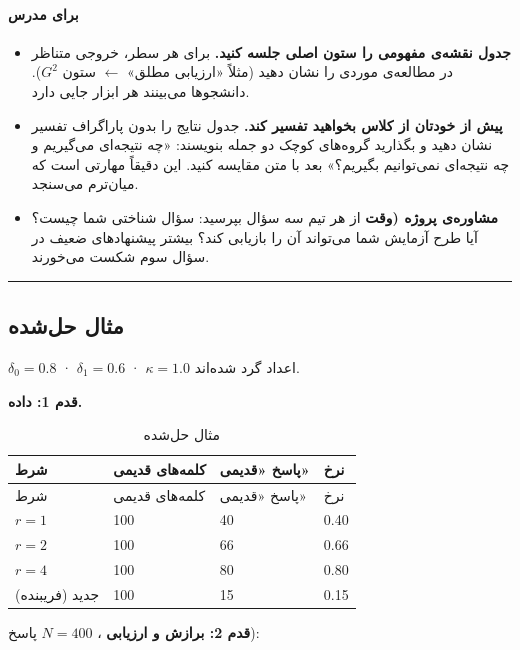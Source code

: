 \paragraph{برای مدرس}

\begin{itemize}
\tightlist
\item
  \textbf{جدول نقشه‌ی مفهومی را ستون اصلی جلسه کنید.} برای هر سطر، خروجی
  متناظر در مطالعه‌ی موردی را نشان دهید (مثلاً «ارزیابی مطلق» \ensuremath{\leftarrow} ستون
  \(G^2\)). دانشجوها می‌بینند هر ابزار جایی دارد.
\item
  \textbf{پیش از خودتان از کلاس بخواهید تفسیر کند.} جدول نتایج را بدون
  پاراگراف تفسیر نشان دهید و بگذارید گروه‌های کوچک دو جمله بنویسند: «چه
  نتیجه‌ای می‌گیریم و چه نتیجه‌ای نمی‌توانیم بگیریم؟» بعد با متن مقایسه
  کنید. این دقیقاً مهارتی است که میان‌ترم می‌سنجد.
\item
  \textbf{مشاوره‌ی پروژه (وقت } از هر تیم سه سؤال بپرسید: سؤال
  شناختی شما چیست؟ آیا طرح آزمایش شما می‌تواند آن را بازیابی کند؟ بیشتر
  پیشنهادهای ضعیف در سؤال سوم شکست می‌خورند.
\end{itemize}

\begin{center}\rule{0.5\linewidth}{0.5pt}\end{center}

\subsection{مثال حل‌شده}

\(\delta_0 = 0.8\) · \(\delta_1 = 0.6\) · \(\kappa = 1.0\) اعداد گرد
شده‌اند.

\textbf{قدم 1: داده.}

\begin{longtable}[]{@{}llll@{}}
\caption{\centering مثال حل‌شده}\tabularnewline
\toprule\noalign{}
شرط & کلمه‌های قدیمی & پاسخ «قدیمی» & نرخ \\
\midrule\noalign{}
\endfirsthead
\toprule\noalign{}
شرط & کلمه‌های قدیمی & پاسخ «قدیمی» & نرخ \\
\midrule\noalign{}
\endhead
\bottomrule\noalign{}
\endlastfoot
\(r = 1\) & 100 & 40 & 0.40 \\
\(r = 2\) & 100 & 66 & 0.66 \\
\(r = 4\) & 100 & 80 & 0.80 \\
جدید (فریبنده) & 100 & 15 & 0.15 \\
\end{longtable}

\textbf{قدم 2: برازش و ارزیابی} ، \(N = 400\) پاسخ):


